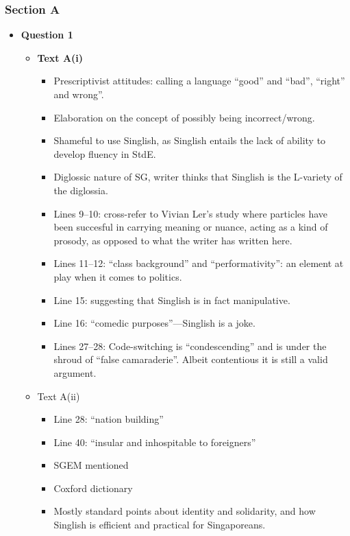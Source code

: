\documentclass[../main.tex]{subfiles}
\begin{document}
			\subsubsection*{Section A}
				\begin{itemize}
					\item \textbf{Question 1} \begin{itemize}
						\item \textbf{Text A(i)} \begin{itemize}
							\item Prescriptivist attitudes: calling a language ``good'' and ``bad'', ``right'' and wrong''.
							\item Elaboration on the concept of possibly being incorrect/wrong.
							\item Shameful to use Singlish, as Singlish entails the lack of ability to develop fluency in StdE.
							\item Diglossic nature of SG, writer thinks that Singlish is the L-variety of the diglossia.
							\item Lines 9--10: cross-refer to Vivian Ler's study where particles have been succesful in carrying meaning or nuance, acting as a kind of prosody, as opposed to what the writer has written here.
							\item Lines 11--12: ``class background'' and ``performativity'': an element at play when it comes to politics.
							\item Line 15: suggesting that Singlish is in fact manipulative.
							\item Line 16: ``comedic purposes''---Singlish is a joke.
							\item Lines 27--28: Code-switching is ``condescending'' and is under the shroud of ``false camaraderie''. Albeit contentious it is still a valid argument.
						\end{itemize}
						\item Text A(ii) \begin{itemize}
							\item Line 28: ``nation building''
							\item Line 40: ``insular and inhospitable to foreigners''
							\item SGEM mentioned
							\item Coxford dictionary
							\item Mostly standard points about identity and solidarity, and how Singlish is efficient and practical for Singaporeans.
						\end{itemize}

\end{itemize}
\end{itemize}
\end{document}
